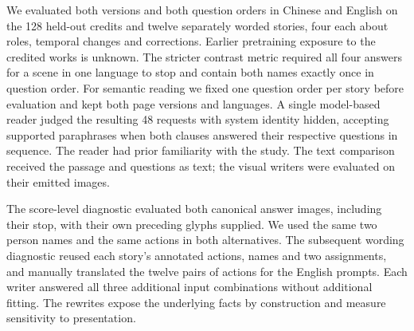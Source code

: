 We evaluated both versions and both question orders in Chinese and English on the 128 held-out credits and twelve separately worded stories, four each about roles, temporal changes and corrections. Earlier pretraining exposure to the credited works is unknown. The stricter contrast metric required all four answers for a scene in one language to stop and contain both names exactly once in question order. For semantic reading we fixed one question order per story before evaluation and kept both page versions and languages. A single model-based reader judged the resulting 48 requests with system identity hidden, accepting supported paraphrases when both clauses answered their respective questions in sequence. The reader had prior familiarity with the study. The text comparison received the passage and questions as text; the visual writers were evaluated on their emitted images.

The score-level diagnostic evaluated both canonical answer images, including their stop, with their own preceding glyphs supplied. We used the same two person names and the same actions in both alternatives. The subsequent wording diagnostic reused each story's annotated actions, names and two assignments, and manually translated the twelve pairs of actions for the English prompts. Each writer answered all three additional input combinations without additional fitting. The rewrites expose the underlying facts by construction and measure sensitivity to presentation.
